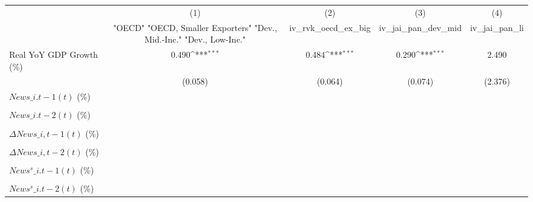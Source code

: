 {
\def\sym#1{\ifmmode^{#1}\else\(^{#1}\)\fi}
\begin{tabular}{l*{4}{c}}
\toprule
                    &\multicolumn{1}{c}{(1)}&\multicolumn{1}{c}{(2)}&\multicolumn{1}{c}{(3)}&\multicolumn{1}{c}{(4)}\\
                    &\multicolumn{1}{c}{ "OECD" "OECD, Smaller Exporters" "Dev., Mid.-Inc." "Dev., Low-Inc."}&\multicolumn{1}{c}{iv\_rvk\_oecd\_ex\_big}&\multicolumn{1}{c}{iv\_jai\_pan\_dev\_mid}&\multicolumn{1}{c}{iv\_jai\_pan\_li}\\
\midrule
Real YoY GDP Growth (\%)&       0.490\sym{***}&       0.484\sym{***}&       0.290\sym{***}&       2.490         \\
                    &     (0.058)         &     (0.064)         &     (0.074)         &     (2.376)         \\
\addlinespace
$ News\_{i.t-1}(t)$ (\%)&                     &                     &                     &                     \\
                    &                     &                     &                     &                     \\
\addlinespace
$ News\_{i.t-2}(t)$ (\%)&                     &                     &                     &                     \\
                    &                     &                     &                     &                     \\
\addlinespace
$ \Delta News\_{i,t-1}(t)$ (\%)&                     &                     &                     &                     \\
                    &                     &                     &                     &                     \\
\addlinespace
$ \Delta News\_{i,t-2}(t)$ (\%)&                     &                     &                     &                     \\
                    &                     &                     &                     &                     \\
\addlinespace
$ News^s\_{i.t-1}(t)$ (\%)&                     &                     &                     &                     \\
                    &                     &                     &                     &                     \\
\addlinespace
$ News^s\_{i.t-2}(t)$ (\%)&                     &                     &                     &                     \\

\end{tabular}}
